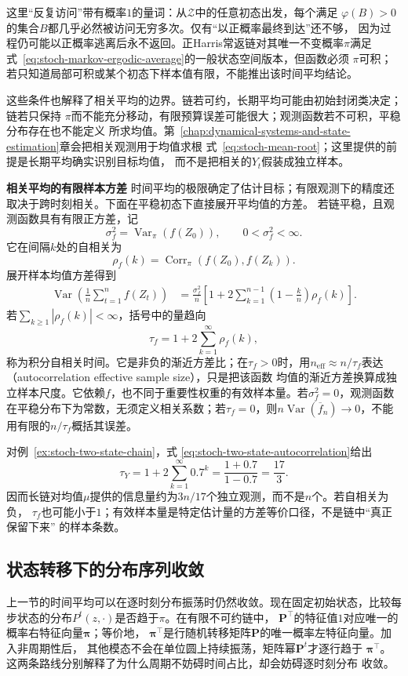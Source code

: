 这里“反复访问”带有概率$1$的量词：从$\mathcal{Z}$中的任意初态出发，每个满足
$\varphi(B)>0$的集合$B$都几乎必然被访问无穷多次。仅有“以正概率最终到达”还不够，
因为过程仍可能以正概率逃离后永不返回。正Harris常返链对其唯一不变概率$\pi$满足
式~\eqref{eq:stoch-markov-ergodic-average}的一般状态空间版本，但函数必须
$\pi$可积；若只知道局部可积或某个初态下样本值有限，不能推出该时间平均结论。

这些条件也解释了相关平均的边界。链若可约，长期平均可能由初始封闭类决定；链若只保持
$\pi$而不能充分移动，有限预算误差可能很大；观测函数若不可积，平稳分布存在也不能定义
所求均值。第~\ref{chap:dynamical-systems-and-state-estimation}章会把相关观测用于均值求根
式~\eqref{eq:stoch-mean-root}；这里提供的前提是长期平均确实识别目标均值，
而不是把相关的$Y_t$假装成独立样本。

\par\medskip\noindent\textbf{相关平均的有限样本方差}\quad
时间平均的极限确定了估计目标；有限观测下的精度还取决于跨时刻相关。下面在平稳初态下直接展开平均值的方差。
若链平稳，且观测函数具有有限正方差，记
\[
\sigma_f^2=\operatorname{Var}_{\pi}(f(Z_0)),\qquad 0<\sigma_f^2<\infty.
\]
它在间隔\(k\)处的自相关为
\[
\rho_f(k)=\operatorname{Corr}_{\pi}(f(Z_0),f(Z_k)).
\]
展开样本均值方差得到
\begin{align}
  \operatorname{Var}\left(
    \frac1n\sum_{t=1}^{n}f(Z_t)
  \right)
  &=
  \frac{\sigma_f^2}{n}
  \left[
    1+
    2\sum_{k=1}^{n-1}
      \left(1-\frac{k}{n}\right)\rho_f(k)
  \right].
  \label{eq:stoch-markov-average-variance}
\end{align}
若$\sum_{k\geq1}|\rho_f(k)|<\infty$，括号中的量趋向
\[
  \tau_f
  =
  1+2\sum_{k=1}^{\infty}\rho_f(k),
\]
称为积分自相关时间。它是非负的渐近方差比；在\(\tau_f>0\)时，用$n_{\mathrm{eff}}\approx n/\tau_f$表达
（autocorrelation effective sample size），只是把该函数
均值的渐近方差换算成独立样本尺度。它依赖$f$，也不同于重要性权重的有效样本量。若\(\sigma_f^2=0\)，观测函数在平稳分布下为常数，无须定义相关系数；若\(\tau_f=0\)，则\(n\operatorname{Var}(\overline f_n)\to0\)，不能用有限的\(n/\tau_f\)概括其误差。

对例~\ref{ex:stoch-two-state-chain}，式
\eqref{eq:stoch-two-state-autocorrelation}给出
\[
  \tau_Y=1+2\sum_{k=1}^{\infty}0.7^k
  =\frac{1+0.7}{1-0.7}=\frac{17}{3}.
\]
因而长链对均值$\mu$提供的信息量约为$3n/17$个独立观测，而不是$n$个。若自相关为负，
$\tau_f$也可能小于$1$；有效样本量是特定估计量的方差等价口径，不是链中“真正保留下来”
的样本条数。

\subsection{状态转移下的分布序列收敛}
\label{sec:rv-state-distribution-limits}
上一节的时间平均可以在逐时刻分布振荡时仍然收敛。现在固定初始状态，比较每步状态的分布\(P^t(z,\cdot)\)是否趋于\(\pi\)。在有限不可约链中，
$\bm{P}^{\top}$的特征值$1$对应唯一的概率右特征向量$\bm{\pi}$；等价地，
$\bm{\pi}^{\top}$是行随机转移矩阵$\bm{P}$的唯一概率左特征向量。加入非周期性后，
其他模态不会在单位圆上持续振荡，矩阵幂$\bm{P}^t$才逐行趋于
$\bm{\pi}^{\top}$。这两条路线分别解释了为什么周期不妨碍时间占比，却会妨碍逐时刻分布
收敛。

